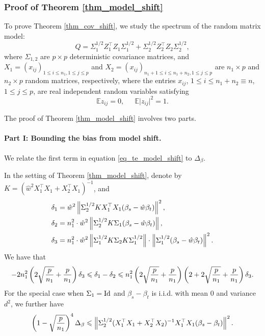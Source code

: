 \subsubsection{Proof of Theorem \ref{thm_model_shift}}\label{sec_pfmain}

\noindent{}
To prove Theorem \ref{thm_cov_shift}, we study the spectrum of the random matrix model:
$$Q= \Sigma_1^{1/2}  Z_1^{\top} Z_1 \Sigma_1^{1/2}  + \Sigma_2^{1/2}  Z_2^{\top} Z_2 \Sigma_2^{1/2} ,$$
where $\Sigma_{1,2}$ are $p\times p$ deterministic covariance matrices, and $X_1=(x_{ij})_{1\le i \le n_1, 1\le j \le p}$ and $X_2=(x_{ij})_{n_1+1\le i \le n_1+n_2, 1\le j \le p}$ are $n_1\times p$ and $n_2 \times p$ random matrices, respectively, where the entries $x_{ij}$, $1 \leq i \leq n_1+n_2\equiv n$, $1 \leq j \leq p$, are real independent random variables satisfying
\begin{equation}\label{eq_12moment} %
\mathbb{E} z_{ij} =0, \ \quad \ \mathbb{E} \vert z_{ij} \vert^2  = 1.
\end{equation}

The proof of Theorem \ref{thm_model_shift} involves two parts.

\paragraph{Part I: Bounding the bias from model shift.}
We relate the first term in equation \eqref{eq_te_model_shift} to $\Delta_{\beta}$.
\begin{proposition}\label{prop_model_shift}
	In the setting of Theorem \ref{thm_model_shift},
	denote by $K = (\hat{w}^2X_1^{\top}X_1 + X_2^{\top}X_1)^{-1}$, and
	\begin{align*}
		\delta_1 &= \hat{w}^2 \left\| \Sigma_2^{1/2} K X_1^{\top}X_1(\beta_s - \hat{w}\beta_t) \right\|^2, \\
		\delta_2 &= n_1^2\cdot \hat{w}^2 \left\| \Sigma_2^{1/2}K\Sigma_1(\beta_s - \hat{w}\beta_t) \right\|, \\
		\delta_3 &= n_1^2\cdot \hat{w}^2 \left\| \Sigma_1^{1/2} K \Sigma_2 K \Sigma_1^{1/2} \right\| \cdot \left\| \Sigma_1^{1/2} (\beta_s - \hat{w}\beta_t) \right\|^2.
	\end{align*}
	We have that
	\begin{align*}
		-2n_1^2\left({{2\sqrt{\frac{p}{n_1}}} + {\frac{p}{n_1}}}\right) \delta_3
		\leqslant  \delta_1 - \delta_2
		\leqslant n_1^2\left({2\sqrt{\frac{p}{n_1}} + \frac{p}{n_1}}\right)\left({2 + 2\sqrt{\frac{p}{n_1}} + \frac{p}{n_1}}\right)\delta_3.
	\end{align*}
	For the special case when $\Sigma_1 = \operatorname{Id}$ and $\beta_s - \beta_t$ is i.i.d. with mean $0$ and variance $d^2$, we further have
	\begin{align*}
		\left({1 - \sqrt{\frac{p}{n_1}}}\right)^4 \Delta_{\beta}
		\leqslant \left\| \Sigma_2^{1/2} (X_1^{\top}X_1 + X_2^{\top}X_2)^{-1}X_1^{\top}X_1(\beta_s - \beta_t) \right\|^2.
	\end{align*}
\end{proposition}

